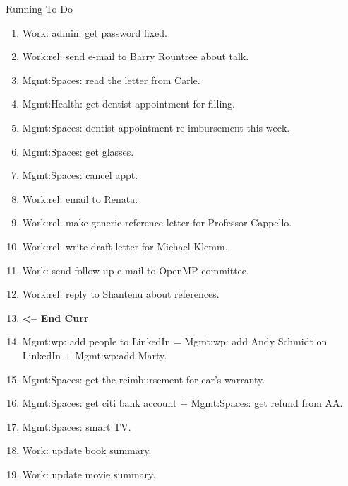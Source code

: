 \begin{frame}[allowframebreaks]{Running To Do}
\begin{enumerate}
\item \tiny Work: admin: get password fixed. 
\item \tiny Work:rel: send e-mail to Barry Rountree about
  talk.   

\item \tiny Mgmt:Spaces: read the letter from Carle. 
\item \tiny Mgmt:Health: get dentist appointment for filling. 
\item \tiny Mgmt:Spaces: dentist appointment re-imbursement this
  week. 

\item \tiny Mgmt:Spaces: get glasses. 
\item \tiny Mgmt:Spaces: cancel appt.
\item \tiny Work:rel: email to Renata. 

\item \tiny Work:rel: make generic reference letter for Professor
  Cappello.  
\item \tiny Work:rel: write draft letter for Michael Klemm.
\item \tiny Work: send follow-up e-mail to OpenMP committee. 
\item \tiny Work:rel: reply to Shantenu about references.  
\item \tiny \textbf{ <-- End Curr }

\item \tiny Mgmt:wp: add people to LinkedIn =  Mgmt:wp: add Andy  Schmidt on LinkedIn +  Mgmt:wp:add Marty.
\item \tiny Mgmt:Spaces: get the reimbursement for car's warranty.

\item \tiny Mgmt:Spaces: get citi bank account + Mgmt:Spaces: get
  refund from AA. 
\item \tiny Mgmt:Spaces: smart TV.
\item \tiny Work: update book summary.  
\item \tiny Work: update movie summary.
\end{enumerate}
\end{frame}

